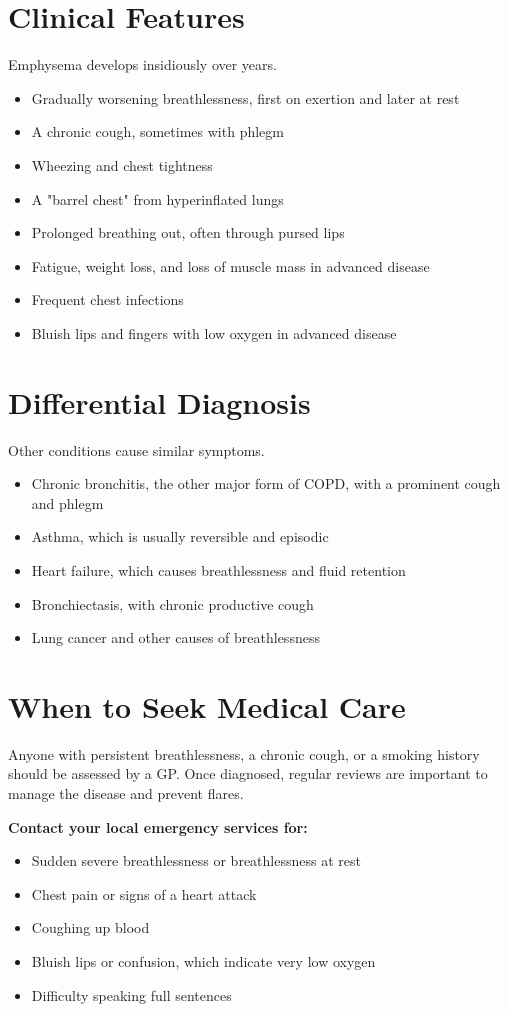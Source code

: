 \section*{Clinical Features}
Emphysema develops insidiously over years.
\begin{itemize}
    \item Gradually worsening breathlessness, first on exertion and later at rest
    \item A chronic cough, sometimes with phlegm
    \item Wheezing and chest tightness
    \item A "barrel chest" from hyperinflated lungs
    \item Prolonged breathing out, often through pursed lips
    \item Fatigue, weight loss, and loss of muscle mass in advanced disease
    \item Frequent chest infections
    \item Bluish lips and fingers with low oxygen in advanced disease
\end{itemize}

\section*{Differential Diagnosis}
Other conditions cause similar symptoms.
\begin{itemize}
    \item Chronic bronchitis, the other major form of COPD, with a prominent cough and phlegm
    \item Asthma, which is usually reversible and episodic
    \item Heart failure, which causes breathlessness and fluid retention
    \item Bronchiectasis, with chronic productive cough
    \item Lung cancer and other causes of breathlessness
\end{itemize}

\section*{When to Seek Medical Care}
Anyone with persistent breathlessness, a chronic cough, or a smoking history should be assessed by a GP. Once diagnosed, regular reviews are important to manage the disease and prevent flares.

\textbf{Contact your local emergency services for:}
\begin{itemize}
    \item Sudden severe breathlessness or breathlessness at rest
    \item Chest pain or signs of a heart attack
    \item Coughing up blood
    \item Bluish lips or confusion, which indicate very low oxygen
    \item Difficulty speaking full sentences
\end{itemize}

